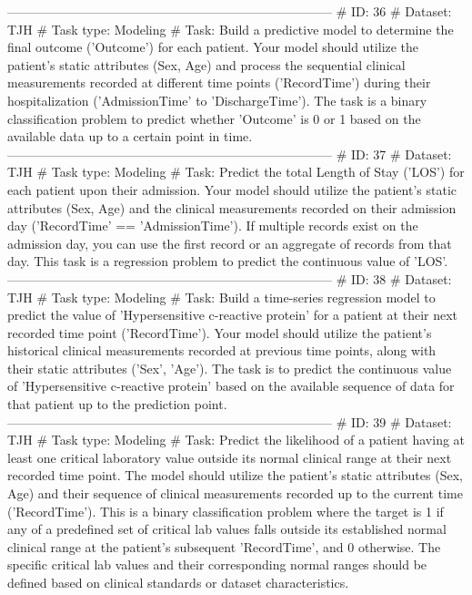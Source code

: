 \begin{tcolorbox}[colback=cadmiumgreen!5!white,colframe=forestgreen!75!white,breakable,title=\textit{Generated analytical tasks in task 4.}]
\begin{VerbatimWrap}
-----------------------------------------------------------------------------
# ID: 36  
# Dataset: TJH 
# Task type: Modeling
# Task: Build a predictive model to determine the final outcome ('Outcome') for each patient. Your model should utilize the patient's static attributes (Sex, Age) and process the sequential clinical measurements recorded at different time points ('RecordTime') during their hospitalization ('AdmissionTime' to 'DischargeTime'). The task is a binary classification problem to predict whether 'Outcome' is 0 or 1 based on the available data up to a certain point in time.
-----------------------------------------------------------------------------
# ID: 37  
# Dataset: TJH 
# Task type: Modeling
# Task: Predict the total Length of Stay ('LOS') for each patient upon their admission. Your model should utilize the patient's static attributes (Sex, Age) and the clinical measurements recorded on their admission day ('RecordTime' == 'AdmissionTime'). If multiple records exist on the admission day, you can use the first record or an aggregate of records from that day. This task is a regression problem to predict the continuous value of 'LOS'.
-----------------------------------------------------------------------------
# ID: 38  
# Dataset: TJH 
# Task type: Modeling
# Task: Build a time-series regression model to predict the value of 'Hypersensitive c-reactive protein' for a patient at their next recorded time point ('RecordTime'). Your model should utilize the patient's historical clinical measurements recorded at previous time points, along with their static attributes ('Sex', 'Age'). The task is to predict the continuous value of 'Hypersensitive c-reactive protein' based on the available sequence of data for that patient up to the prediction point.
-----------------------------------------------------------------------------
# ID: 39  
# Dataset: TJH 
# Task type: Modeling
# Task: Predict the likelihood of a patient having at least one critical laboratory value outside its normal clinical range at their next recorded time point. The model should utilize the patient's static attributes (Sex, Age) and their sequence of clinical measurements recorded up to the current time ('RecordTime'). This is a binary classification problem where the target is 1 if any of a predefined set of critical lab values falls outside its established normal clinical range at the patient's subsequent 'RecordTime', and 0 otherwise. The specific critical lab values and their corresponding normal ranges should be defined based on clinical standards or dataset characteristics.

\end{VerbatimWrap}
\end{tcolorbox}
